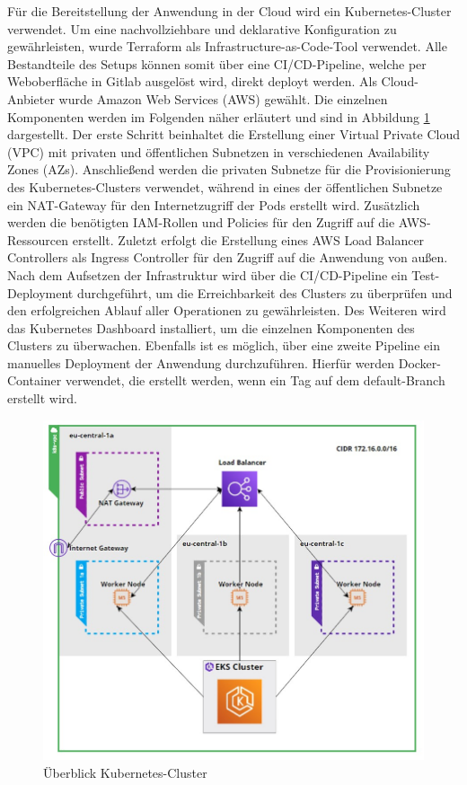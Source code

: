 \documentclass[a4paper, 10pt, conference]{IEEEtran}
\begin{document}
Für die Bereitstellung der Anwendung in der Cloud wird ein Kubernetes-Cluster \cite{k8s} verwendet. 
Um eine nachvollziehbare und deklarative Konfiguration zu gewährleisten, wurde Terraform \cite{terraform} als Infrastructure-as-Code-Tool verwendet. 
Alle Bestandteile des Setups können somit über eine CI/CD-Pipeline, welche per Weboberfläche in Gitlab ausgelöst wird, direkt deployt werden.
Als Cloud-Anbieter wurde Amazon Web Services (AWS) \cite{aws} gewählt. Die einzelnen Komponenten werden im Folgenden näher erläutert und sind in Abbildung \ref{fig:infra} dargestellt.
Der erste Schritt beinhaltet die Erstellung einer Virtual Private Cloud (VPC) mit privaten und öffentlichen Subnetzen in verschiedenen Availability Zones (AZs).
Anschließend werden die privaten Subnetze für die Provisionierung des Kubernetes-Clusters verwendet, während in eines der öffentlichen Subnetze ein NAT-Gateway für den Internetzugriff der Pods erstellt wird.
Zusätzlich werden die benötigten IAM-Rollen und Policies für den Zugriff auf die AWS-Ressourcen erstellt.
Zuletzt erfolgt die Erstellung eines AWS Load Balancer Controllers als Ingress Controller für den Zugriff auf die Anwendung von außen.
Nach dem Aufsetzen der Infrastruktur wird über die CI/CD-Pipeline ein Test-Deployment durchgeführt, um die Erreichbarkeit des Clusters zu überprüfen und den erfolgreichen Ablauf aller Operationen zu gewährleisten.
Des Weiteren wird das Kubernetes Dashboard installiert, um die einzelnen Komponenten des Clusters zu überwachen.
Ebenfalls ist es möglich, über eine zweite Pipeline ein manuelles Deployment der Anwendung durchzuführen.
Hierfür werden Docker-Container verwendet, die erstellt werden, wenn ein Tag auf dem default-Branch erstellt wird.

\begin{figure}[thp]
    \centering
    \includegraphics[width=\linewidth]{k8s}
    \caption{Überblick Kubernetes-Cluster}
    \label{fig:infra}
\end{figure}
\end{document}

